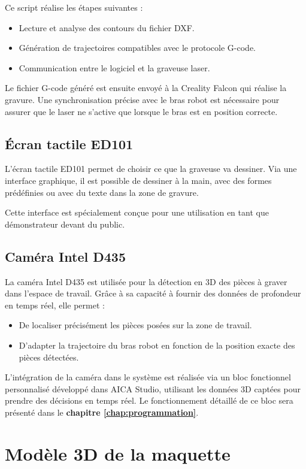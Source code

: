 Ce script réalise les étapes suivantes :
\begin{itemize}
    \item Lecture et analyse des contours du fichier DXF.
    \item Génération de trajectoires compatibles avec le protocole G-code.
    \item Communication entre le logiciel et la graveuse laser.
\end{itemize}

Le fichier G-code généré est ensuite envoyé à la Creality Falcon qui réalise la gravure. Une synchronisation précise avec le bras robot est nécessaire pour assurer que le laser ne s’active que lorsque le bras est en position correcte.

\subsection{Écran tactile ED101}

L’écran tactile ED101 permet de choisir ce que la graveuse va dessiner. Via une interface graphique, il est possible de dessiner à la main, avec des formes prédéfinies ou avec du texte dans la zone de gravure.

Cette interface est spécialement conçue pour une utilisation en tant que démonstrateur devant du public.

\subsection{Caméra Intel D435}

La caméra Intel D435 est utilisée pour la détection en 3D des pièces à graver dans l’espace de travail. Grâce à sa capacité à fournir des données de profondeur en temps réel, elle permet :
\begin{itemize}
    \item De localiser précisément les pièces posées sur la zone de travail.
    \item D’adapter la trajectoire du bras robot en fonction de la position exacte des pièces détectées.
\end{itemize}

L’intégration de la caméra dans le système est réalisée via un bloc fonctionnel personnalisé développé dans AICA Studio, utilisant les données 3D captées pour prendre des décisions en temps réel. Le fonctionnement détaillé de ce bloc sera présenté dans le \textbf{chapitre \ref{chap:programmation}}.

\section{Modèle 3D de la maquette}

